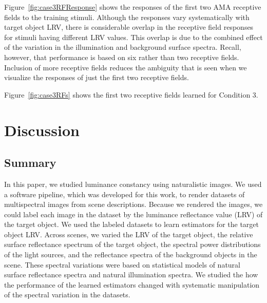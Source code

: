 \documentclass{jov}
\begin{document}
Figure~\ref{fig:case3RFResponse} shows the responses of the first two AMA receptive fields to the training stimuli.
Although the responses vary systematically with target object LRV, there is considerable overlap in the receptive field responses for stimuli having different LRV values.
This overlap is due to the combined effect of the variation in the illumination and background surface spectra.
Recall, however, that performance is based on six rather than two receptive fields.
Inclusion of more receptive fields reduces the ambiguity that is seen when we visualize the responses of just the first two receptive fields.

Figure~\ref{fig:case3RFs} shows the first two receptive fields learned for Condition 3.


\section{Discussion} \label{Discussion}

\subsection{Summary}

In this paper, we studied luminance constancy using naturalistic images.
We used a software pipeline, which was developed for this work, to render datasets of multispectral images from scene descriptions.
Because we rendered the images, we could label each image in the dataset by the luminance reflectance value (LRV) of the target object.
We used the labeled datasets to learn estimators for the target object LRV.
Across scenes, we varied the LRV of the target object, the relative surface reflectance spectrum of the target object, 
the spectral power distributions of the light sources, and the reflectance spectra of the background objects in the scene.
These spectral variations were based on statistical models of natural surface reflectance spectra and natural illumination spectra.
We studied the how the performance of the learned estimators changed with systematic manipulation of the spectral variation in the datasets.
\end{document}
